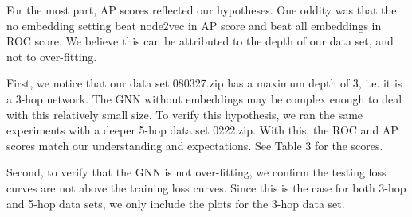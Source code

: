 \documentclass[10pt,twocolumn,letterpaper]{article}
\begin{document}
For the most part, AP scores reflected our hypotheses. One oddity was that the no embedding setting beat node2vec in AP score and beat all embeddings in ROC score. We believe this can be attributed to the depth of our data set, and not to over-fitting.

First, we notice that our data set 080327.zip has a maximum depth of 3, i.e. it is a 3-hop network. The GNN without embeddings may be complex enough to deal with this relatively small size. To verify this hypothesis, we ran the same experiments with a deeper 5-hop data set 0222.zip. With this, the ROC and AP scores match our understanding and expectations. See Table 3 for the scores.

Second, to verify that the GNN is not over-fitting, we confirm the testing loss curves are not above the training loss curves. Since this is the case for both 3-hop and 5-hop data sets, we only include the plots for the 3-hop data set.
\end{document}
